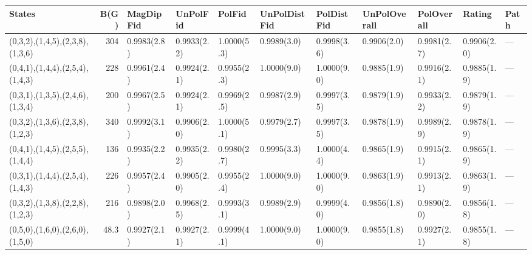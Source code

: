 \begin{tabular}{lrlllllllll}
\hline
 States                          &   B(G) & MagDipFid   & UnPolFid    & PolFid      & UnPolDistFid   & PolDistFid   & UnPolOverall   & PolOverall   & Rating      & Path   \\
\hline
 (0,3,2),(1,4,5),(2,3,8),(1,3,6) &  304   & 0.9983(2.8) & 0.9933(2.2) & 1.0000(5.3) & 0.9989(3.0)    & 0.9998(3.6)  & 0.9906(2.0)    & 0.9981(2.7)  & 0.9906(2.0) & ---    \\
 (0,4,1),(1,4,4),(2,5,4),(1,4,3) &  228   & 0.9961(2.4) & 0.9924(2.1) & 0.9955(2.3) & 1.0000(9.0)    & 1.0000(9.0)  & 0.9885(1.9)    & 0.9916(2.1)  & 0.9885(1.9) & ---    \\
 (0,3,1),(1,3,5),(2,4,6),(1,3,4) &  200   & 0.9967(2.5) & 0.9924(2.1) & 0.9969(2.5) & 0.9987(2.9)    & 0.9997(3.5)  & 0.9879(1.9)    & 0.9933(2.2)  & 0.9879(1.9) & ---    \\
 (0,3,2),(1,3,6),(2,3,8),(1,2,3) &  340   & 0.9992(3.1) & 0.9906(2.0) & 1.0000(5.1) & 0.9979(2.7)    & 0.9997(3.5)  & 0.9878(1.9)    & 0.9989(2.9)  & 0.9878(1.9) & ---    \\
 (0,4,1),(1,4,5),(2,5,5),(1,4,4) &  136   & 0.9935(2.2) & 0.9935(2.2) & 0.9980(2.7) & 0.9995(3.3)    & 1.0000(4.4)  & 0.9865(1.9)    & 0.9915(2.1)  & 0.9865(1.9) & ---    \\
 (0,3,1),(1,4,4),(2,5,4),(1,4,3) &  226   & 0.9957(2.4) & 0.9905(2.0) & 0.9955(2.4) & 1.0000(9.0)    & 1.0000(9.0)  & 0.9863(1.9)    & 0.9913(2.1)  & 0.9863(1.9) & ---    \\
 (0,3,2),(1,3,8),(2,2,8),(1,2,3) &  216   & 0.9898(2.0) & 0.9968(2.5) & 0.9993(3.1) & 0.9989(2.9)    & 0.9999(4.0)  & 0.9856(1.8)    & 0.9890(2.0)  & 0.9856(1.8) & ---    \\
 (0,5,0),(1,6,0),(2,6,0),(1,5,0) &   48.3 & 0.9927(2.1) & 0.9927(2.1) & 0.9999(4.1) & 1.0000(9.0)    & 1.0000(9.0)  & 0.9855(1.8)    & 0.9927(2.1)  & 0.9855(1.8) & ---    \\
\hline
\end{tabular}